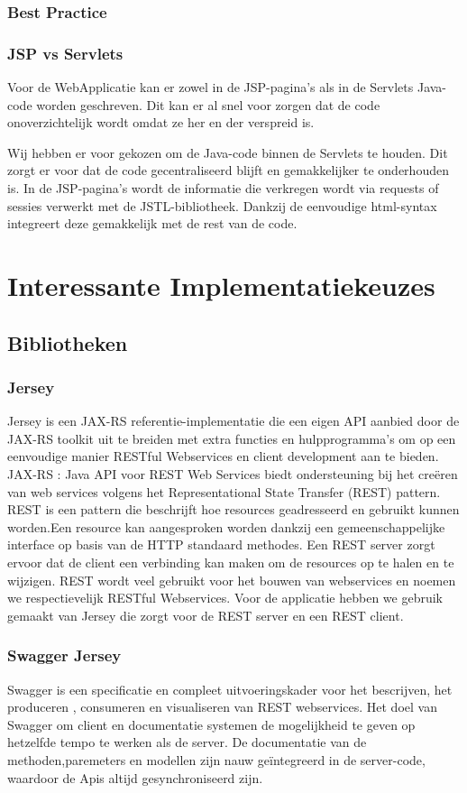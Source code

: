 \documentclass[pdftex,a4paper,12pt,twoside]{report}
\begin{document}
\subsection{Best Practice}
\subsection{JSP vs Servlets}
Voor de WebApplicatie kan er zowel in de JSP-pagina's als in de Servlets Java-code worden geschreven. Dit kan er al snel voor zorgen dat de code onoverzichtelijk wordt omdat ze her en der verspreid is.

Wij hebben er voor gekozen om de Java-code binnen de Servlets te houden. Dit zorgt er voor dat de code gecentraliseerd blijft en gemakkelijker te onderhouden is. In de JSP-pagina's wordt de informatie die verkregen wordt via requests of sessies verwerkt met de JSTL-bibliotheek. Dankzij de eenvoudige html-syntax integreert deze gemakkelijk met de rest van de code.

\chapter{Interessante Implementatiekeuzes}
\section{Bibliotheken}
\subsection{Jersey}

Jersey is een JAX-RS referentie-implementatie die een eigen API aanbied door de JAX-RS toolkit uit te breiden met extra functies en hulpprogramma's om op een eenvoudige manier RESTful Webservices en client development aan te bieden.
JAX-RS : Java API voor REST Web Services biedt ondersteuning bij het creëren van web services volgens het Representational State Transfer (REST) pattern.
REST is een pattern die beschrijft hoe resources geadresseerd en gebruikt kunnen worden.Een resource kan aangesproken worden dankzij een gemeenschappelijke interface op basis van de HTTP standaard methodes.
Een REST server zorgt ervoor dat de client een verbinding kan maken om de resources op te halen en te wijzigen. REST wordt veel gebruikt voor het bouwen van webservices en noemen we respectievelijk RESTful Webservices.
Voor de applicatie hebben we gebruik gemaakt van Jersey die zorgt voor de REST server en een REST client.


\subsection{Swagger Jersey}
Swagger is een specificatie en compleet uitvoeringskader voor het bescrijven, het produceren , consumeren en visualiseren van REST webservices. Het doel van Swagger om client en documentatie systemen de mogelijkheid te geven op hetzelfde tempo te werken als de server. De documentatie van de methoden,paremeters en modellen zijn nauw geïntegreerd in de server-code, waardoor de Apis altijd gesynchroniseerd zijn.
\end{document}
